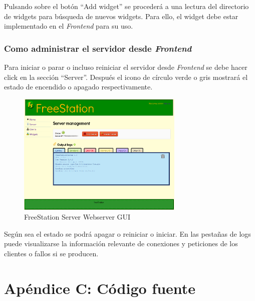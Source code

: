     Pulsando sobre el botón ``Add widget'' se procederá a una lectura del
    directorio de widgets para búsqueda de nuevos widgets. Para ello, el
    widget debe estar implementado en el \emph{Frontend} para su uso.
    
    \subsection{Como administrar el servidor desde \emph{Frontend}}
    
    Para iniciar o parar o incluso reiniciar el servidor desde \emph{Frontend}
    se debe hacer click en la sección ``Server''. Después el icono de círculo
    verde o gris mostrará el estado de encendido o apagado respectivamente.
    
    \newpage
    
    \begin{figure}[h]
        \begin{center}
            \includegraphics[width=300px]{src/img/freestation-server-gui.png}
            \caption[FreeStation Server Webserver GUI] {FreeStation Server Webserver GUI}
            \label{fig:serverGUI}
        \end{center}
    \end{figure}

    Según sea el estado se podrá apagar o reiniciar o iniciar. En las pestañas
    de logs puede visualizarse la información relevante de conexiones y
    peticiones de los clientes o fallos si se producen.
    
    
    
    \cleardoublepage


    \chapter{Apéndice C: Código fuente}
    

